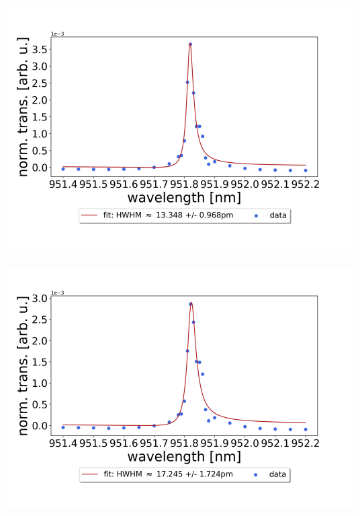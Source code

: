 \begin{figure}[h!]
    \centering
    \begin{subfigure}[b]{0.49\textwidth}
        \includegraphics[width=\textwidth]{figures/results/single fano fits/220um_M5_fit_1.png}
        \caption{}
        \label{fig:220um_M5_fit_1}
    \end{subfigure}
    \begin{subfigure}[b]{0.49\textwidth}
        \includegraphics[width=\textwidth]{figures/results/single fano fits/220um_M5_fit_2.png}
        \caption{}
        \label{fig:220um_M5_fit_2}
    \end{subfigure}
    \begin{subfigure}[b]{0.49\textwidth}

\end{subfigure}
\end{figure}
